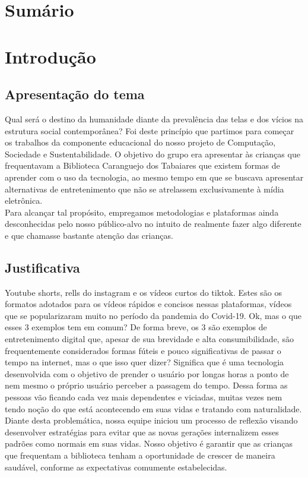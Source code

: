 \documentclass[a4paper,12pt]{article}
\begin{document}
\section{\LARGE{Sumário}}
\tableofcontents

\newpage

\section{\LARGE{Introdução}}
\vspace{0.5cm}

\subsection{\Large{Apresentação do tema}}
Qual será o destino da humanidade diante da prevalência das telas e dos vícios na estrutura social contemporânea? Foi deste princípio que partimos para começar os trabalhos da componente educacional do nosso projeto de Computação, Sociedade e Sustentabilidade. O objetivo do grupo era apresentar às crianças que frequentavam a Biblioteca Caranguejo dos Tabaiares que existem formas de aprender com o uso da tecnologia, ao mesmo tempo em que se buscava apresentar alternativas de entretenimento que não se atrelassem exclusivamente à mídia eletrônica.\vspace{0.3cm}\\
Para alcançar tal propósito, empregamos metodologias e plataformas ainda desconhecidas pelo nosso público-alvo no intuito de realmente fazer algo diferente e que chamasse bastante atenção das crianças.
\vspace{0.2cm}

\subsection{\Large{Justificativa}}
Youtube shorts, rells do instagram e os vídeos curtos do tiktok. Estes são os formatos adotados para os vídeos rápidos e concisos nessas plataformas, vídeos que se popularizaram muito no período da pandemia do Covid-19. Ok, mas o que esses 3 exemplos tem em comum? De forma breve, os 3 são exemplos de entretenimento digital que, apesar de sua brevidade e alta consumibilidade, são frequentemente considerados formas fúteis e pouco significativas de passar o tempo na internet, mas o que isso quer dizer? Significa que é uma tecnologia desenvolvida com o objetivo de prender o usuário por longas horas a ponto de nem mesmo o próprio usuário perceber a passagem do tempo. Dessa forma as pessoas vão ficando cada vez mais dependentes e viciadas, muitas vezes nem tendo noção do que está acontecendo em suas vidas e tratando com naturalidade.\vspace{0.3cm}\\
Diante desta problemática, nossa equipe iniciou um processo de reflexão visando desenvolver estratégias para evitar que as novas gerações internalizem esses padrões como normais em suas vidas. Nosso objetivo é garantir que as crianças que frequentam a biblioteca tenham a oportunidade de crescer de maneira saudável, conforme as expectativas comumente estabelecidas.
\vspace{0.2cm}
\end{document}
